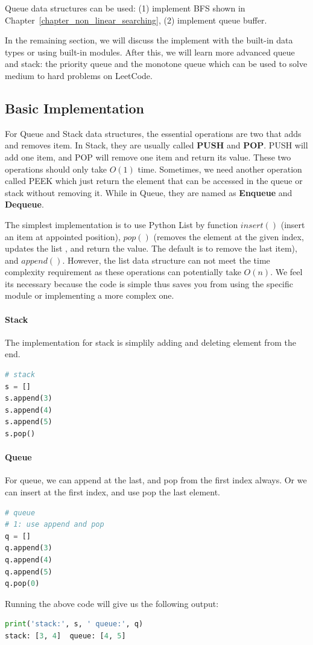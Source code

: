 \documentclass[../main.tex]{subfiles}
\begin{document}
Queue data structures can be used: (1) implement BFS shown in Chapter~\ref{chapter_non_linear_searching}, (2) implement queue buffer. 

In the remaining section, we will discuss the implement with the built-in data types or using built-in modules.  After this, we will learn more advanced queue and stack: the priority queue and the monotone queue which can be used to solve medium to hard problems on LeetCode.

\subsection{Basic Implementation}

For Queue and Stack data structures, the essential operations are  two that adds and removes item. In Stack, they are usually called \textbf{PUSH} and \textbf{POP}. PUSH will add one item, and POP will remove one item and return its value. These two operations should only take $O(1)$ time. Sometimes, we need another operation called PEEK which just return the element that can be accessed in the queue or stack without removing it. While in Queue, they are named as \textbf{Enqueue} and \textbf{Dequeue}.

The simplest implementation is to use Python List by function $insert()$ (insert an item at appointed position), $pop()$ (removes the element at the given index, updates the list , and return the value. The default is to remove the last item), and $append()$.  However, the list data structure can not meet the time complexity requirement as these operations can potentially take $O(n)$. We feel its necessary because the code is simple thus saves you from using the specific module or implementing a more complex one.  

\paragraph{Stack} The implementation for stack is simplily adding and deleting element from the end. 
\begin{lstlisting}[language = Python]
# stack
s = []
s.append(3)
s.append(4)
s.append(5)
s.pop()
\end{lstlisting}

\paragraph{Queue} For queue, we can append at the last, and pop from the first index always. Or we can insert at the first index, and use pop the last element.
\begin{lstlisting}[language = Python]
# queue 
# 1: use append and pop
q = []
q.append(3)
q.append(4)
q.append(5)
q.pop(0)
\end{lstlisting}
Running the above code will give us the following output:
\begin{lstlisting}[language=Python]
print('stack:', s, ' queue:', q)
stack: [3, 4]  queue: [4, 5]
\end{lstlisting}
\end{document}
